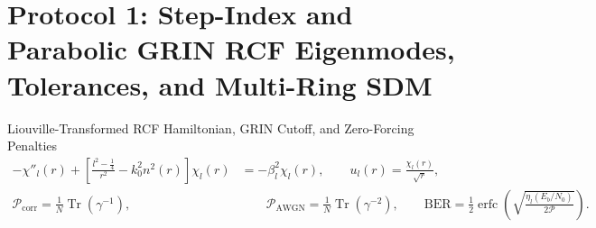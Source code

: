 \documentclass[10pt,letterpaper]{article}
\numberwithin{equation}{section}
\begin{document}
\section{Protocol 1: Step-Index and Parabolic GRIN RCF Eigenmodes, Tolerances, and Multi-Ring SDM}
\label{sec:p2_rcf}

\begin{targeteq}{Liouville-Transformed RCF Hamiltonian, GRIN Cutoff, and Zero-Forcing Penalties}
\begin{align*}
  -\chi''_l(r) + \left[\frac{l^2 - \frac{1}{4}}{r^2} - k_0^2 n^2(r)\right]\chi_l(r) &= -\beta_l^2\chi_l(r), \qquad u_l(r) = \frac{\chi_l(r)}{\sqrt{r}}, \\
  \mathcal{P}_{\mathrm{corr}} = \frac{1}{N}\operatorname{Tr}(\gamma^{-1}), &\qquad \mathcal{P}_{\mathrm{AWGN}} = \frac{1}{N}\operatorname{Tr}(\gamma^{-2}), \qquad \mathrm{BER} = \frac{1}{2}\operatorname{erfc}\!\left(\sqrt{\frac{\eta_l (E_b/N_0)}{2\mathcal{P}}}\right).
\end{align*}
\end{targeteq}
\end{document}
